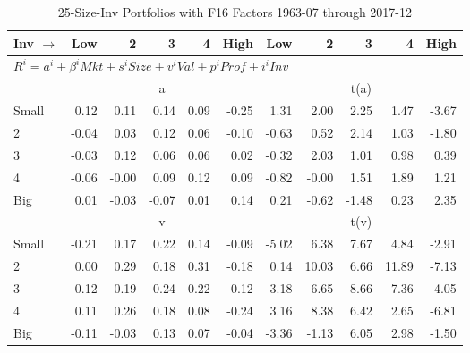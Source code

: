 
\begin{table}[!ht]
\footnotesize
\centering
\caption{25-Size-Inv Portfolios with F16 Factors 1963-07 through 2017-12}
\begin{tabular}{lrrrrrrrrrr}
  \toprule
    Inv $\rightarrow$ & Low & 2 & 3 & 4 & High & Low & 2 & 3 & 4 & High \\ 
  \midrule
  \multicolumn{11}{l}{$R^i=a^i+\beta^iMkt+s^iSize+v^iVal+p^iProf+i^iInv$} \\

  
    
      & \multicolumn{5}{c}{a} & \multicolumn{5}{c}{t(a)}
    
    \\
      \cmidrule(r){2-6} \cmidrule(r){7-11}

    Small   & 0.12  & 0.11  & 0.14  & 0.09  & -0.25  & 1.31  & 2.00  & 2.25  & 1.47  & -3.67  \\
         2  & -0.04  & 0.03  & 0.12  & 0.06  & -0.10  & -0.63  & 0.52  & 2.14  & 1.03  & -1.80  \\
         3  & -0.03  & 0.12  & 0.06  & 0.06  & 0.02  & -0.32  & 2.03  & 1.01  & 0.98  & 0.39  \\
         4  & -0.06  & -0.00  & 0.09  & 0.12  & 0.09  & -0.82  & -0.00  & 1.51  & 1.89  & 1.21  \\
    Big     & 0.01  & -0.03  & -0.07  & 0.01  & 0.14  & 0.21  & -0.62  & -1.48  & 0.23  & 2.35  \\

  
    
      & \multicolumn{5}{c}{v} & \multicolumn{5}{c}{t(v)}
    
    \\
      \cmidrule(r){2-6} \cmidrule(r){7-11}

    Small   & -0.21  & 0.17  & 0.22  & 0.14  & -0.09  & -5.02  & 6.38  & 7.67  & 4.84  & -2.91  \\
         2  & 0.00  & 0.29  & 0.18  & 0.31  & -0.18  & 0.14  & 10.03  & 6.66  & 11.89  & -7.13  \\
         3  & 0.12  & 0.19  & 0.24  & 0.22  & -0.12  & 3.18  & 6.65  & 8.66  & 7.36  & -4.05  \\
         4  & 0.11  & 0.26  & 0.18  & 0.08  & -0.24  & 3.16  & 8.38  & 6.42  & 2.65  & -6.81  \\
    Big     & -0.11  & -0.03  & 0.13  & 0.07  & -0.04  & -3.36  & -1.13  & 6.05  & 2.98  & -1.50  \\

  
    

\end{tabular}
\end{table}
